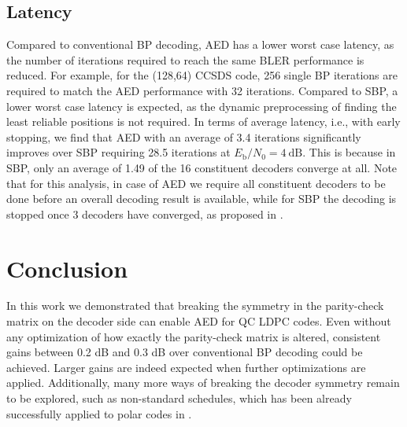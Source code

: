 \documentclass[conference]{IEEEtran}
\newcommand\new[1]{#1}
\begin{document}
\begin{NoHyper}
\new{
\subsection{Latency}
Compared to conventional \ac{BP} decoding, \ac{AED} has a lower worst case latency, as the number of iterations required to reach the same \ac{BLER} performance is reduced. For example, for the (128,64) CCSDS code, 256 single BP iterations are required to match the AED performance with 32 iterations. Compared to \ac{SBP}, a lower worst case latency is expected, as the dynamic preprocessing of finding the least reliable positions is not required. In terms of average latency, i.e., with early stopping, we find that \ac{AED} with an average of 3.4 iterations significantly improves over \ac{SBP} requiring 28.5 iterations at $E_\mathrm{b}/N_0 = 4~\text{dB}$. This is because in \ac {SBP}, only an average of 1.49 of the 16 constituent decoders converge at all. Note that for this analysis, in case of AED we require all constituent decoders to be done before an overall decoding result is available, while for \ac{SBP} the decoding is stopped once 3 decoders have converged, as proposed in \cite{WehnSaturatedMinSum}.
}

\section{Conclusion}\label{sec:conc}
In this work we demonstrated that breaking the symmetry in the parity-check matrix on the decoder side can enable \ac{AED} for \ac{QC} \ac{LDPC} codes. Even without any optimization of how exactly the parity-check matrix is altered, consistent gains between 0.2 dB and 0.3 dB over conventional \ac{BP} decoding could be achieved. Larger gains are indeed expected when further optimizations are applied. Additionally, many more ways of breaking the decoder symmetry remain to be explored, \new{such as non-standard schedules, which has been already successfully applied to polar codes in \cite{CRC_BPL_ISIT20}}.


\end{NoHyper}
\end{document}

